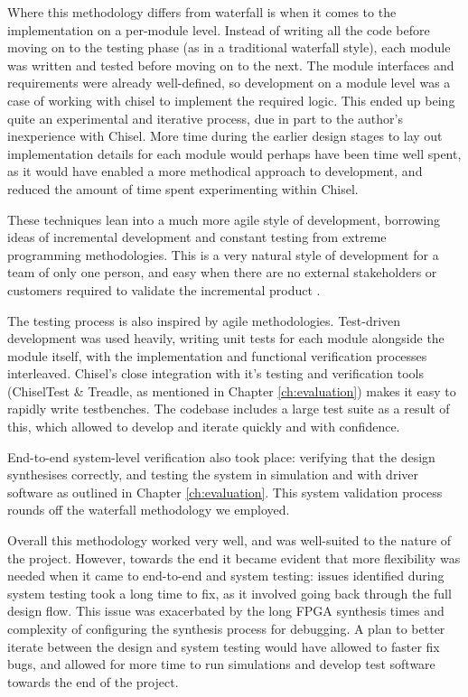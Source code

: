Where this methodology differs from waterfall is when it comes to the implementation on a per-module level. Instead of writing all the code before moving on to the testing phase (as in a traditional waterfall style), each module was written and tested before moving on to the next. The module interfaces and requirements were already well-defined, so development on a module level was a case of working with chisel to implement the required logic. This ended up being quite an experimental and iterative process, due in part to the author's inexperience with Chisel. More time during the earlier design stages to lay out implementation details for each module would perhaps have been time well spent, as it would have enabled a more methodical approach to development, and reduced the amount of time spent experimenting within Chisel.

These techniques lean into a much more agile style of development, borrowing ideas of incremental development and constant testing from extreme programming methodologies. This is a very natural style of development for a team of only one person, and easy when there are no external stakeholders or customers required to validate the incremental product \cite{softeng}.

The testing process is also inspired by agile methodologies. Test-driven development was used heavily, writing unit tests for each module alongside the module itself, with the implementation and functional verification processes interleaved. Chisel's close integration with it's testing and verification tools (ChiselTest \& Treadle, as mentioned in Chapter \ref{ch:evaluation}) makes it easy to rapidly write testbenches. The codebase includes a large test suite as a result of this, which allowed to develop and iterate quickly and with confidence.

End-to-end system-level verification also took place: verifying that the design synthesises correctly, and testing the system in simulation and with driver software as outlined in Chapter \ref{ch:evaluation}. This system validation process rounds off the waterfall methodology we employed.

Overall this methodology worked very well, and was well-suited to the nature of the project. However, towards the end it became evident that more flexibility was needed when it came to end-to-end and system testing: issues identified during system testing took a long time to fix, as it involved going back through the full design flow. This issue was exacerbated by the long FPGA synthesis times and complexity of configuring the synthesis process for debugging. A plan to better iterate between the design and system testing would have allowed to faster fix bugs, and allowed for more time to run simulations and develop test software towards the end of the project.


